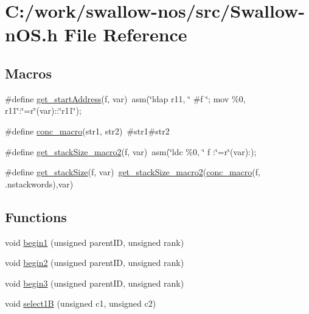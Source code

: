 \hypertarget{_swallow-n_o_s_8h}{}\section{C\+:/work/swallow-\/nos/src/\+Swallow-\/n\+O\+S.h File Reference}
\label{_swallow-n_o_s_8h}
\subsection*{Macros}
\begin{DoxyCompactItemize}
\item 
\#define \hyperlink{_swallow-n_o_s_8h_a8aed423e695e022d571b555e291399aa}{get\+\_\+start\+Address}(f,  var)~asm(\char`\"{}ldap r11, \char`\"{} \#f \char`\"{}; mov \%0, r11\char`\"{}\+:\char`\"{}=r\char`\"{}(var)\+::\char`\"{}r11\char`\"{});
\item 
\#define \hyperlink{_swallow-n_o_s_8h_a9c9a01b3a3fd630d58932179abb1498a}{conc\+\_\+macro}(str1,  str2)~\#str1\#str2
\item 
\#define \hyperlink{_swallow-n_o_s_8h_a685ddebdd81eb8bdfc7cffaffdd6169e}{get\+\_\+stack\+Size\+\_\+macro2}(f,  var)~asm(\char`\"{}ldc \%0, \char`\"{} f \+:\char`\"{}=r\char`\"{}(var)\+:);
\item 
\#define \hyperlink{_swallow-n_o_s_8h_a6a81e98097c9b47b321e3565997316f0}{get\+\_\+stack\+Size}(f,  var)~\hyperlink{_swallow-n_o_s_8h_a685ddebdd81eb8bdfc7cffaffdd6169e}{get\+\_\+stack\+Size\+\_\+macro2}(\hyperlink{_swallow-n_o_s_8h_a9c9a01b3a3fd630d58932179abb1498a}{conc\+\_\+macro}(f, .nstackwords),var)
\end{DoxyCompactItemize}
\subsection*{Functions}
\begin{DoxyCompactItemize}
\item 
void \hyperlink{_swallow-n_o_s_8h_a1aea871146af548036800eedb26082ed}{begin1} (unsigned parent\+I\+D, unsigned rank)
\item 
void \hyperlink{_swallow-n_o_s_8h_a1abf6a01d834f9e290ee7456a9c8c207}{begin2} (unsigned parent\+I\+D, unsigned rank)
\item 
void \hyperlink{_swallow-n_o_s_8h_a12670594797d9ef98eb862adb259f62d}{begin3} (unsigned parent\+I\+D, unsigned rank)
\item 
void \hyperlink{_swallow-n_o_s_8h_ae497526406001473d1b17617356cfaff}{select1\+B} (unsigned c1, unsigned c2)
\end{DoxyCompactItemize}


